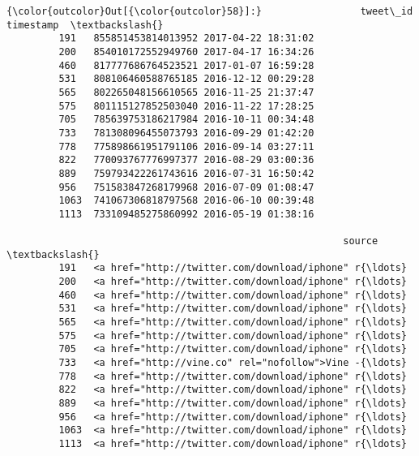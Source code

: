 \documentclass[11pt]{article}
\begin{document}
\begin{Verbatim}[commandchars=\\\{\}]
{\color{outcolor}Out[{\color{outcolor}58}]:}                 tweet\_id           timestamp  \textbackslash{}
         191   855851453814013952 2017-04-22 18:31:02   
         200   854010172552949760 2017-04-17 16:34:26   
         460   817777686764523521 2017-01-07 16:59:28   
         531   808106460588765185 2016-12-12 00:29:28   
         565   802265048156610565 2016-11-25 21:37:47   
         575   801115127852503040 2016-11-22 17:28:25   
         705   785639753186217984 2016-10-11 00:34:48   
         733   781308096455073793 2016-09-29 01:42:20   
         778   775898661951791106 2016-09-14 03:27:11   
         822   770093767776997377 2016-08-29 03:00:36   
         889   759793422261743616 2016-07-31 16:50:42   
         956   751583847268179968 2016-07-09 01:08:47   
         1063  741067306818797568 2016-06-10 00:39:48   
         1113  733109485275860992 2016-05-19 01:38:16   
         
                                                          source  \textbackslash{}
         191   <a href="http://twitter.com/download/iphone" r{\ldots}   
         200   <a href="http://twitter.com/download/iphone" r{\ldots}   
         460   <a href="http://twitter.com/download/iphone" r{\ldots}   
         531   <a href="http://twitter.com/download/iphone" r{\ldots}   
         565   <a href="http://twitter.com/download/iphone" r{\ldots}   
         575   <a href="http://twitter.com/download/iphone" r{\ldots}   
         705   <a href="http://twitter.com/download/iphone" r{\ldots}   
         733   <a href="http://vine.co" rel="nofollow">Vine -{\ldots}   
         778   <a href="http://twitter.com/download/iphone" r{\ldots}   
         822   <a href="http://twitter.com/download/iphone" r{\ldots}   
         889   <a href="http://twitter.com/download/iphone" r{\ldots}   
         956   <a href="http://twitter.com/download/iphone" r{\ldots}   
         1063  <a href="http://twitter.com/download/iphone" r{\ldots}   
         1113  <a href="http://twitter.com/download/iphone" r{\ldots}   
         

\end{Verbatim}
\end{document}
